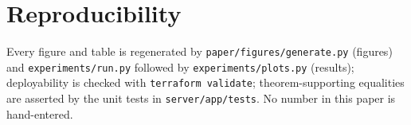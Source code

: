 \documentclass[journal]{IEEEtran}
\theoremstyle{plain}
\theoremstyle{definition}
\newcommand{\code}[1]{\texttt{\small #1}}
\begin{document}
\section*{Reproducibility}
Every figure and table is regenerated by \code{paper/figures/generate.py} (figures)
and \code{experiments/run.py} followed by \code{experiments/plots.py} (results); deployability is checked with \code{terraform
validate}; theorem-supporting equalities are asserted by the unit tests in
\code{server/app/tests}. No number in this paper is hand-entered.



\end{document}
